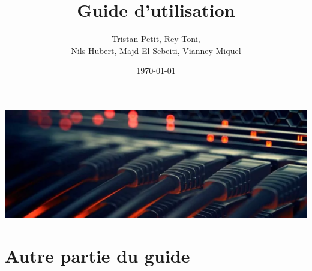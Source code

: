\documentclass{article}
\begin{document}
\title{Guide d'utilisation}
\author{Tristan Petit, Rey Toni, \\
 Nils Hubert, Majd El Sebeiti, Vianney Miquel}
\date{\today}
\maketitle

\begin{center}
    \vspace{0.5cm}
    \includegraphics[width=1\textwidth]{images/reseauxMain.png}
\end{center}

\maketitle

\newpage

\section{Autre partie du guide}
\end{document}
